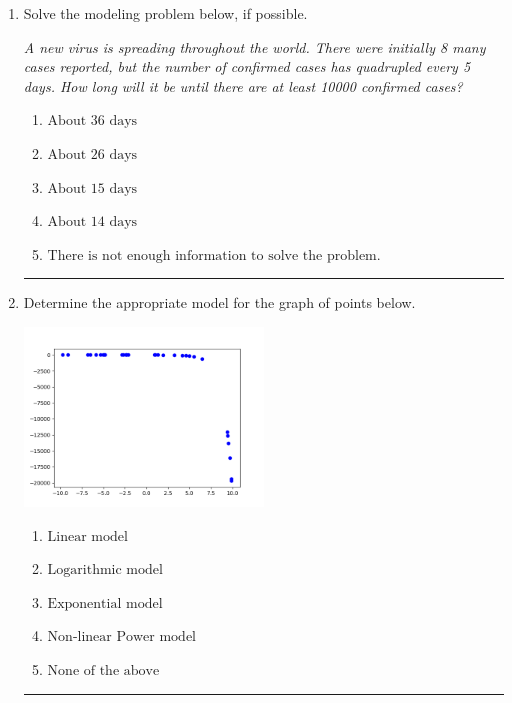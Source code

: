\documentclass[14pt]{extbook}
\newcommand{\litem}[1]{\item#1\hspace*{-1cm}\rule{\textwidth}{0.4pt}}
\begin{document}
\begin{enumerate}
{\begin{enumerate}[label=\Alph*.]
\end{enumerate} }
\litem{
Solve the modeling problem below, if possible.
\begin{center}
    \textit{ A new virus is spreading throughout the world. There were initially 8 many cases reported, but the number of confirmed cases has quadrupled every 5 days. How long will it be until there are at least 10000 confirmed cases? }
\end{center}
\begin{enumerate}[label=\Alph*.]
\item \( \text{About } 36 \text{ days} \)
\item \( \text{About } 26 \text{ days} \)
\item \( \text{About } 15 \text{ days} \)
\item \( \text{About } 14 \text{ days} \)
\item \( \text{There is not enough information to solve the problem.} \)

\end{enumerate} }
\litem{
Determine the appropriate model for the graph of points below.
\begin{center}
    \includegraphics[width=0.5\textwidth]{../Figures/identifyModelGraph12CopyC.png}
\end{center}
\begin{enumerate}[label=\Alph*.]
\item \( \text{Linear model} \)
\item \( \text{Logarithmic model} \)
\item \( \text{Exponential model} \)
\item \( \text{Non-linear Power model} \)
\item \( \text{None of the above} \)

\end{enumerate} }
\end{enumerate}
\end{document}
